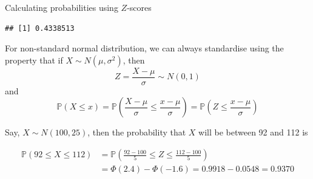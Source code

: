 \documentclass[ignorenonframetext,]{beamer}
\begin{document}
\begin{frame}[fragile]{Calculating probabilities using \(Z\)-scores}
\begin{verbatim}
## [1] 0.4338513
\end{verbatim}

For non-standard normal distribution, we can always standardise using
the property that if \(X\sim N(\mu,\sigma^2)\), then
\[Z=\frac{X-\mu}{\sigma}\sim N(0,1)\] and
\[\mathbb{P}(X\le x)=\mathbb{P}\left(\frac{X-\mu}{\sigma}\le \frac{x-\mu}{\sigma} \right)=\mathbb{P}\left(Z\le \frac{x-\mu}{\sigma} \right)\]

Say, \(X\sim N(100,25)\), then the probability that \(X\) will be
between 92 and 112 is

\begin{align*}
\mathbb{P}(92\le X\le 112)
&=\mathbb{P}(\frac{92-100}{5}\le Z\le \frac{112-100}{5})\\
&=\Phi(2.4)-\Phi(-1.6)=0.9918-0.0548=0.9370
\end{align*}

\end{frame}
\end{document}

